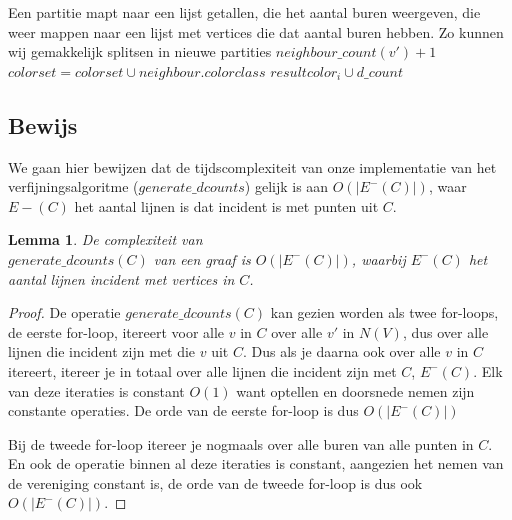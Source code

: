 \documentclass[twoside]{article}
\newtheorem{lemma}[theorem]{Lemma}
\begin{document}
\begin{multicols}{2}
\begin{algorithm}[H]
Een partitie mapt naar een lijst getallen, die het aantal buren weergeven, die weer mappen naar een lijst met vertices die dat aantal buren hebben. Zo kunnen wij gemakkelijk splitsen in nieuwe partities \;
{
{$ neighbour\_count(v') + 1 $ \;
$ colorset = colorset \cup  neighbour.colorclass  $  \;}}
{
$ result color_{i} \cup d\_count $}
\caption{$ generate\_dcounts $}
\end{algorithm}

\subsection{Bewijs}

We gaan hier bewijzen dat de tijdscomplexiteit van onze implementatie van het verfijningsalgoritme ($generate\_dcounts$) gelijk is aan $ O(|E^{-}(C)|)$,  waar $ E{-}(C) $ het aantal lijnen is dat incident is met punten uit $C$.

\begin{lemma}
De complexiteit van\\ $generate\_dcounts(C)$ van een graaf is $O(|E^{-}(C)|) $,  waarbij  $E^{-}(C)$ het aantal lijnen incident met vertices in $C$.
\end{lemma}

\begin{proof}
De operatie $generate\_dcounts(C) $ kan gezien worden als twee for-loops, de eerste for-loop, itereert voor alle $v$ in $C$ over alle $v'$ in $N(V)$, dus over alle lijnen die incident zijn met die $v$ uit $C$. Dus als je daarna ook over alle $v$ in $C$ itereert, itereer je in totaal over alle lijnen die incident zijn met $C$, $E^{-}(C)$. Elk van deze iteraties is constant $O(1)$ want optellen en doorsnede nemen zijn constante operaties. De orde van de eerste for-loop is dus $O(|E^{-}(C)|)$

Bij de tweede for-loop itereer je nogmaals over alle buren van alle punten in $C$. En ook de operatie binnen al deze iteraties is constant, aangezien het nemen van de vereniging constant is, de orde van de tweede for-loop is dus ook $O(|E^{-}(C)|)$.


\end{proof}
\end{multicols}
\end{document}

